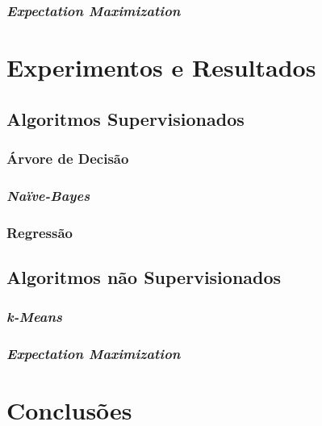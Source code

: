 \documentclass{article}
\begin{document}
\subsubsection{{\b \it Expectation Maximization}}

\section{Experimentos e Resultados}

\subsection{Algoritmos Supervisionados}

\subsubsection{Árvore de Decisão}

\subsubsection{{\b \it Naïve-Bayes}}

\subsubsection{Regressão}

\subsection{Algoritmos não Supervisionados}

\subsubsection{{\b \it k-Means}}

\subsubsection{{\b \it Expectation Maximization}}

\section{Conclusões}


\end{document}
